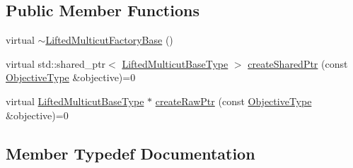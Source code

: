\subsection*{Public Member Functions}
\begin{DoxyCompactItemize}
\item 
virtual \hyperlink{classnifty_1_1graph_1_1lifted__multicut_1_1LiftedMulticutFactoryBase_afb127193878a653b3a8d1e757c78c782}{$\sim$\+Lifted\+Multicut\+Factory\+Base} ()
\item 
virtual std\+::shared\+\_\+ptr$<$ \hyperlink{classnifty_1_1graph_1_1lifted__multicut_1_1LiftedMulticutFactoryBase_a7b9c862fe5eba2ec7438ca48bb398e1c}{Lifted\+Multicut\+Base\+Type} $>$ \hyperlink{classnifty_1_1graph_1_1lifted__multicut_1_1LiftedMulticutFactoryBase_a97ff4e5f55ec719e1292b80a46705923}{create\+Shared\+Ptr} (const \hyperlink{classnifty_1_1graph_1_1lifted__multicut_1_1LiftedMulticutFactoryBase_a485af2377fe0fd34e9e1a635d1546cad}{Objective\+Type} \&objective)=0
\item 
virtual \hyperlink{classnifty_1_1graph_1_1lifted__multicut_1_1LiftedMulticutFactoryBase_a7b9c862fe5eba2ec7438ca48bb398e1c}{Lifted\+Multicut\+Base\+Type} $\ast$ \hyperlink{classnifty_1_1graph_1_1lifted__multicut_1_1LiftedMulticutFactoryBase_a07b8e86b878158f352224f0988bcc234}{create\+Raw\+Ptr} (const \hyperlink{classnifty_1_1graph_1_1lifted__multicut_1_1LiftedMulticutFactoryBase_a485af2377fe0fd34e9e1a635d1546cad}{Objective\+Type} \&objective)=0
\end{DoxyCompactItemize}


\subsection{Member Typedef Documentation}
\hypertarget{classnifty_1_1graph_1_1lifted__multicut_1_1LiftedMulticutFactoryBase_a7b9c862fe5eba2ec7438ca48bb398e1c}{}
